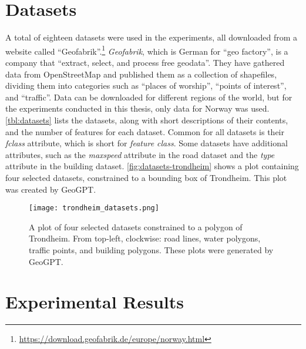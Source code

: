 \section{Datasets}
\label{sec:datasets}

A total of eighteen datasets were used in the experiments, all downloaded from a website called \enquote{Geofabrik}.\footnote{\url{https://download.geofabrik.de/europe/norway.html}} \textit{Geofabrik}, which is German for \enquote{geo factory}, is a company that \enquote{extract, select, and process free geodata}. They have gathered data from OpenStreetMap and published them as a collection of shapefiles, dividing them into categories such as \enquote{places of worship}, \enquote{points of interest}, and \enquote{traffic}. Data can be downloaded for different regions of the world, but for the experiments conducted in this thesis, only data for Norway was used. \autoref{tbl:datasets} lists the datasets, along with short descriptions of their contents, and the number of features for each dataset. Common for all datasets is their \emph{fclass} attribute, which is short for \emph{feature class}. Some datasets have additional attributes, such as the \emph{maxspeed} attribute in the road dataset and the \emph{type} attribute in the building dataset. \autoref{fig:datasets-trondheim} shows a plot containing four selected datasets, constrained to a bounding box of Trondheim. This plot was created by GeoGPT.



\begin{figure}
    \centering
    \texttt{[image: trondheim\_datasets.png]}
    \caption[A plot of four selected datasets constrained to a polygon of Trondheim]{A plot of four selected datasets constrained to a polygon of Trondheim. From top-left, clockwise: road lines, water polygons, traffic points, and building polygons. These plots were generated by GeoGPT.}
    \label{fig:datasets-trondheim}
\end{figure}

\FloatBarrier


\section{Experimental Results}
\label{sec:experimental-results}

